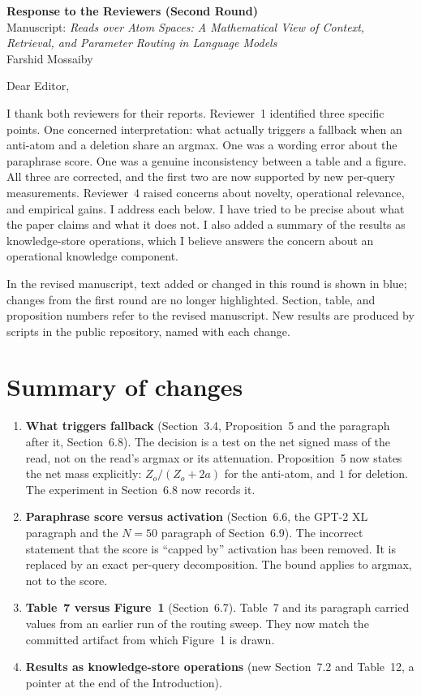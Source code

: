 \documentclass[11pt]{article}
\begin{document}
\begin{center}
{\Large\bfseries Response to the Reviewers (Second Round)}\\[0.5em]
Manuscript: \emph{Reads over Atom Spaces: A Mathematical View of Context, Retrieval, and Parameter Routing in Language Models}\\
Farshid Mossaiby
\end{center}

Dear Editor,

I thank both reviewers for their reports. Reviewer~1 identified three specific points. One concerned interpretation: what actually triggers a fallback when an anti-atom and a deletion share an argmax. One was a wording error about the paraphrase score. One was a genuine inconsistency between a table and a figure. All three are corrected, and the first two are now supported by new per-query measurements. Reviewer~4 raised concerns about novelty, operational relevance, and empirical gains. I address each below. I have tried to be precise about what the paper claims and what it does not. I also added a summary of the results as knowledge-store operations, which I believe answers the concern about an operational knowledge component.

In the revised manuscript, text added or changed in this round is shown in blue; changes from the first round are no longer highlighted. Section, table, and proposition numbers refer to the revised manuscript. New results are produced by scripts in the public repository, named with each change.

\section*{Summary of changes}
\begin{enumerate}[leftmargin=*]
\item \textbf{What triggers fallback} (Section~3.4, Proposition~5 and the paragraph after it, Section~6.8). The decision is a test on the net signed mass of the read, not on the read's argmax or its attenuation. Proposition~5 now states the net mass explicitly: $Z_o/(Z_o+2a)$ for the anti-atom, and $1$ for deletion. The experiment in Section~6.8 now records it.
\item \textbf{Paraphrase score versus activation} (Section~6.6, the GPT-2 XL paragraph and the $N=50$ paragraph of Section~6.9). The incorrect statement that the score is ``capped by'' activation has been removed. It is replaced by an exact per-query decomposition. The bound applies to argmax, not to the score.
\item \textbf{Table~7 versus Figure~1} (Section~6.7). Table~7 and its paragraph carried values from an earlier run of the routing sweep. They now match the committed artifact from which Figure~1 is drawn.
\item \textbf{Results as knowledge-store operations} (new Section~7.2 and Table~12, a pointer at the end of the Introduction).
\end{enumerate}
\end{document}
